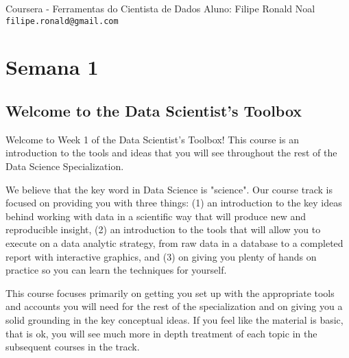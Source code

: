 \textsf{Coursera} - Ferramentas do Cientista de Dados
Aluno: Filipe Ronald Noal\\\texttt{filipe.ronald@gmail.com}


\def\r          {`\textsf{R}'}%


\section{Semana 1}

\subsection{Welcome to the Data Scientist's Toolbox}

Welcome to Week 1 of the Data Scientist's Toolbox! This course is an introduction to the tools and ideas that you will see throughout the rest of the Data Science Specialization.

We believe that the key word in Data Science is "science". Our course track is focused on providing you with three things: (1) an introduction to the key ideas behind working with data in a scientific way that will produce new and reproducible insight, (2) an introduction to the tools that will allow you to execute on a data analytic strategy, from raw data in a database to a completed report with interactive graphics, and (3) on giving you plenty of hands on practice so you can learn the techniques for yourself.

This course focuses primarily on getting you set up with the appropriate tools and accounts you will need for the rest of the specialization and on giving you a solid grounding in the key conceptual ideas. If you feel like the material is basic, that is ok, you will see much more in depth treatment of each topic in the subsequent courses in the track.

